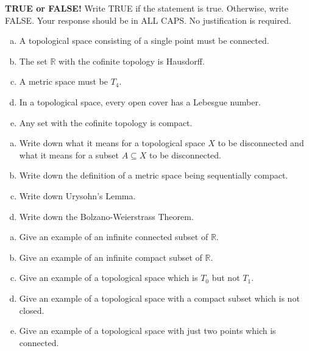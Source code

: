 \documentclass[11pt]{exam}
\theoremstyle{definition}
\begin{document}
\begin{questions}

\addpoints

\question[10]\mbox{}
\textbf{TRUE or FALSE!}  Write  TRUE if the statement is true.  Otherwise, write FALSE.  Your response should be in ALL CAPS.  No justification is required.
\begin{enumerate}[(a)]
\item  
A topological space consisting of a single point must be connected.
\vspace{1.2in}
\item  
The set $\mathbb{R}$ with the cofinite topology is Hausdorff.
\vspace{1.2in}
\item  
A metric space must be $T_4$.
\vspace{1.2in}
\item  
In a topological space, every open cover has a Lebesgue number.
\vspace{1.2in}
\item  
Any set with the cofinite topology is compact.
\end{enumerate}


\newpage
\question[10]\mbox{} %
\begin{enumerate}[(a)]
\item  Write down what it means for a topological space $X$ to be disconnected and what it means for a subset $A\subseteq X$ to be disconnected.
\vspace{2in}
\item  Write down the definition of a metric space being sequentially compact.
\vspace{2in}
\item  Write down Urysohn's Lemma.
\vspace{2in}
\item  Write down the Bolzano-Weierstrass Theorem.
\end{enumerate}

\newpage
\question[10]\mbox{} 
\begin{enumerate}[(a)]
\item  Give an example of an infinite connected subset of $\mathbb{R}$.
\vspace{1.5in}
\item  Give an example of an infinite compact subset of $\mathbb{R}$.
\vspace{1.5in}
\item  Give an example of a topological space which is $T_0$ but not $T_1$.
\vspace{1.5in}
\item  Give an example of a topological space with a compact subset which is not closed.
\vspace{1.5in}
\item  Give an example of a topological space with just two points which is connected.
\end{enumerate}


\end{questions}
\end{document}
